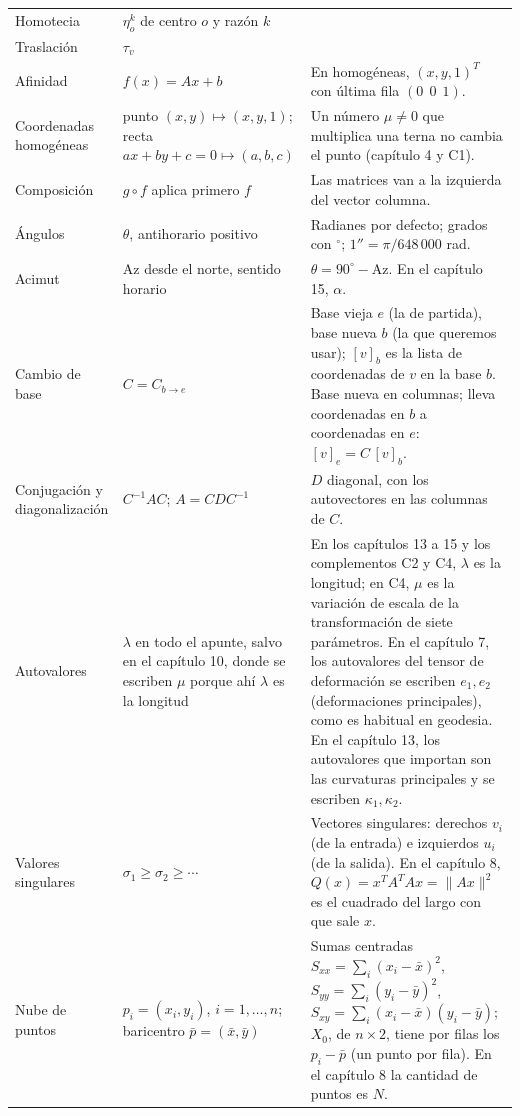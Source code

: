 {\begin{longtable}{@{}>{\raggedright\arraybackslash}p{38mm}>{\raggedright\arraybackslash}p{44mm}>{\raggedright\arraybackslash}p{62mm}@{}}
Homotecia & \(\eta_o^k\) de centro \(o\) y razón \(k\) & \\
Traslación & \(\tau_v\) & \\
Afinidad & \(f(x)=Ax+b\) & En homogéneas, \((x,y,1)^T\) con última fila \((0\ \ 0\ \ 1)\).\\
Coordenadas homogéneas & punto \((x,y)\mapsto(x,y,1)\); recta \(ax+by+c=0\mapsto(a,b,c)\) & Un número \(\mu\neq0\) que multiplica una terna no cambia el punto (capítulo 4 y C1).\\
Composición & \(g\circ f\) aplica primero \(f\) & Las matrices van a la izquierda del vector columna.\\
Ángulos & \(\theta\), antihorario positivo & Radianes por defecto; grados con \(^\circ\); \(1''=\pi/648\,000\) rad.\\
Acimut & \(\mathrm{Az}\) desde el norte, sentido horario & \(\theta=90^\circ-\mathrm{Az}\). En el capítulo 15, \(\alpha\).\\
Cambio de base & \(C=C_{b\to e}\) & Base vieja \(e\) (la de partida), base nueva \(b\) (la que queremos usar); \([v]_b\) es la lista de coordenadas de \(v\) en la base \(b\). Base nueva en columnas; lleva coordenadas en \(b\) a coordenadas en \(e\): \([v]_e=C\,[v]_b\).\\
Conjugación y diagonalización & \(C^{-1}AC\); \(A=CDC^{-1}\) & \(D\) diagonal, con los autovectores en las columnas de \(C\).\\
Autovalores & \(\lambda\) en todo el apunte, salvo en el capítulo 10, donde se escriben \(\mu\) porque ahí \(\lambda\) es la longitud & En los capítulos 13 a 15 y los complementos C2 y C4, \(\lambda\) es la longitud; en C4, \(\mu\) es la variación de escala de la transformación de siete parámetros. En el capítulo 7, los autovalores del tensor de deformación se escriben \(e_1, e_2\) (deformaciones principales), como es habitual en geodesia. En el capítulo 13, los autovalores que importan son las curvaturas principales y se escriben \(\kappa_1,\kappa_2\).\\
Valores singulares & \(\sigma_1\ge\sigma_2\ge\cdots\) & Vectores singulares: derechos \(v_i\) (de la entrada) e izquierdos \(u_i\) (de la salida). En el capítulo 8, \(Q(x)=x^TA^TAx=\lVert Ax\rVert^2\) es el cuadrado del largo con que sale \(x\).\\
Nube de puntos & \(p_i=(x_i,y_i)\), \(i=1,\dots,n\); baricentro \(\bar p=(\bar x,\bar y)\) & Sumas centradas \(S_{xx}=\sum_i(x_i-\bar x)^2\), \(S_{yy}=\sum_i(y_i-\bar y)^2\), \(S_{xy}=\sum_i(x_i-\bar x)(y_i-\bar y)\); \(X_0\), de \(n\times2\), tiene por filas los \(p_i-\bar p\) (un punto por fila). En el capítulo 8 la cantidad de puntos es \(N\).\\

\end{longtable}}
